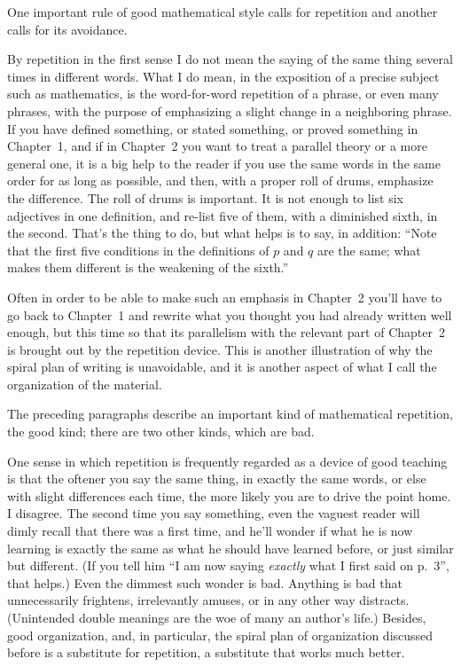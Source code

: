 \documentclass[12pt]{article}
\begin{document}
One important rule of good mathematical style calls for repetition and another calls for its avoidance. 

By repetition in the first sense I do not mean the saying of the same thing several times in different words. What I do mean, in the exposition of a precise subject such as mathematics, is the word-for-word repetition of a phrase, or even many phrases, with the purpose of emphasizing a slight change in a neighboring phrase. If you have defined something, or stated something, or proved something in Chapter~1, and if in Chapter~2 you want to treat a parallel theory or a more general one, it is a big help to the reader if you use the same words in the same order for as long as possible, and then, with a proper roll of drums, emphasize the difference. The roll of drums is important. It is not enough to list six adjectives in one definition, and re-list five of them, with a diminished sixth, in the second. That's the thing to do, but what helps is to say, in addition: ``Note that the first five conditions in the definitions of $p$ and $q$ are the same; what makes them different is the weakening of the sixth.'' 

Often in order to be able to make such an emphasis in Chapter~2 you'll have to go back to Chapter~1 and rewrite what you thought you had already written well enough, but this time so that its parallelism with the relevant part of Chapter~2 is brought out by the repetition device. This is another illustration of why the spiral plan of writing is unavoidable, and it is another aspect of what I call the organization of the material. 

The preceding paragraphs describe an important kind of mathematical repetition, the good kind; there are two other kinds, which are bad.

One sense in which repetition is frequently regarded as a device of good teaching is that the oftener you say the same thing, in exactly the same words, or else with slight differences each time, the more likely you are to drive the point home. I disagree. The second time you say something, even the vaguest reader will dimly recall that there was a first time, and he'll wonder if what he is now learning is exactly the same as what he should have learned before, or just similar but different. (If you tell him ``I am now saying \emph{exactly} what I first said on p.~3'', that helps.) Even the dimmest such wonder is bad. Anything is bad that unnecessarily frightens, irrelevantly amuses, or in any other way distracts. (Unintended double meanings are the woe of many an author's life.) Besides, good organization, and, in particular, the spiral plan of organization discussed before is a substitute for repetition, a substitute that works much better. 
\end{document}
